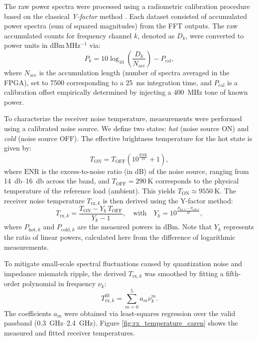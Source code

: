 The raw power spectra were processed using a radiometric calibration procedure based on the classical \emph{Y-factor} method \citep[see][Section 3.6.6]{essential_radio_astronomy}. Each dataset consisted of accumulated power spectra (sum of squared magnitudes) from the FFT outputs. The raw accumulated counts for frequency channel $k$, denoted as $D_k$, were converted to power units in dBm\,MHz$^{-1}$ via:
\begin{equation}
	P_k = 10 \log_{10}\!\left(\frac{D_k}{N_\mathrm{acc}}\right) - P_\mathrm{cal},
\end{equation}
where $N_\mathrm{acc}$ is the accumulation length (number of spectra averaged in the FPGA), set to 7500 corresponding to a \SI{25}{\milli\second} integration time, and $P_\mathrm{cal}$ is a calibration offset empirically determined by injecting a \SI{400}{\mega\hertz} tone of known power.

To characterize the receiver noise temperature, measurements were performed using a calibrated noise source. We define two states: \emph{hot} (noise source ON) and \emph{cold} (noise source OFF). The effective brightness temperature for the hot state is given by:
\begin{equation}
	T_\mathrm{ON} = T_\mathrm{OFF}\left(10^{\frac{\mathrm{ENR}}{10}} + 1\right),
\end{equation}
where $\mathrm{ENR}$ is the excess-to-noise ratio (in dB) of the noise source, ranging from \SIrange{14}{16}{\decibel} across the band, and $T_\mathrm{OFF}=\SI{290}{\kelvin}$ corresponds to the physical temperature of the reference load (ambient). This yields $T_\mathrm{ON}\approx \SI{9550}{\kelvin}$. The receiver noise temperature $T_{\mathrm{rx},k}$ is then derived using the Y-factor method:
\begin{equation}
	T_{\mathrm{rx},k} = \frac{T_\mathrm{ON} - Y_k\,T_\mathrm{OFF}}{Y_k - 1}, 
	\quad \text{with} \quad 
	Y_k = 10^{\frac{P_{\mathrm{hot},k} - P_{\mathrm{cold},k}}{10}},
\end{equation}
where $P_{\mathrm{hot},k}$ and $P_{\mathrm{cold},k}$ are the measured powers in dBm. Note that $Y_k$ represents the ratio of linear powers, calculated here from the difference of logarithmic measurements.

To mitigate small-scale spectral fluctuations caused by quantization noise and impedance mismatch ripple, the derived $T_{\mathrm{rx},k}$ was smoothed by fitting a fifth-order polynomial in frequency $\nu_k$:
\begin{equation}
	T_{\mathrm{rx},k}^{\mathrm{fit}} = \sum_{m=0}^{5} a_m \nu_k^m.
\end{equation}
The coefficients $a_m$ were obtained via least-squares regression over the valid passband (\SIrange{0.3}{2.4}{\giga\hertz}). Figure \ref{fig:rx_temperature_caren} shows the measured and fitted receiver temperatures.

